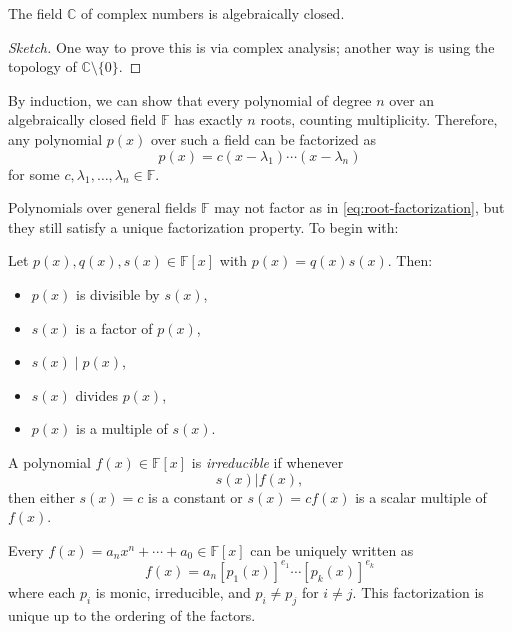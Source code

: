 \begin{theorem} \label{thm:fundamental_theorem_of_algebra}
The field \(\mathbb{C}\) of complex numbers is algebraically closed.
\end{theorem}

\begin{proof}[Sketch]
One way to prove this is via complex analysis; another way is using the topology of \(\mathbb{C} \setminus \{0\}\).
\end{proof}

By induction, we can show that every polynomial of degree \(n\) over an algebraically closed field \(\mathbb{F}\) has exactly \(n\) roots, counting multiplicity. Therefore, any polynomial \(p(x)\) over such a field can be factorized as
\begin{equation}\label{eq:root-factorization}
p(x) = c(x - \lambda_1)\cdots(x - \lambda_n)
\end{equation}
for some \(c, \lambda_1, \dots, \lambda_n \in \mathbb{F}\).

Polynomials over general fields \(\mathbb{F}\) may not factor as in \eqref{eq:root-factorization}, but they still satisfy a unique factorization property. To begin with:
\begin{definition}[Divisibility]
Let \(p(x), q(x), s(x) \in \mathbb{F}[x]\) with \(p(x) = q(x) s(x)\). Then:
\begin{itemize}
    \item \(p(x)\) is divisible by \(s(x)\),
    \item \(s(x)\) is a factor of \(p(x)\),
    \item \(s(x) \mid p(x)\),
    \item \(s(x)\) divides \(p(x)\),
    \item \(p(x)\) is a multiple of \(s(x)\).
\end{itemize}
\end{definition}

\begin{definition}
A polynomial $f(x) \in \mathbb{F}[x]$ is {\it irreducible} if whenever
$$s(x) | f(x),$$
then either $s(x) = c$ is a constant or $s(x) = cf(x)$ is a scalar multiple of $f(x)$.
\end{definition}

\begin{theorem}
Every \(f(x) = a_n x^n + \cdots + a_0 \in \mathbb{F}[x]\) can be uniquely written as
\[
f(x) = a_n [p_1(x)]^{e_1} \cdots [p_k(x)]^{e_k}
\]
where each \(p_i\) is monic, irreducible, and \(p_i \neq p_j\) for \(i \neq j\). This factorization is unique up to the ordering of the factors.
\end{theorem}



